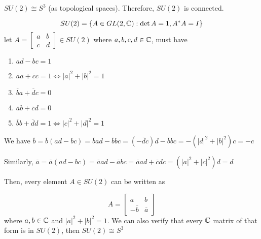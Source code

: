 \documentclass{article}
\begin{document}
\begin{longproof}
\begin{claim}
    $SU(2) \cong S^3$ (as topological spaces). Therefore, $SU(2)$ is connected.
\end{claim}

$$
    SU(2) = \{A \in GL(2, \mathbb{C}): \det A = 1, A^* A = I\}
$$
let $A = \begin{bmatrix} a & b \\ c & d \end{bmatrix} \in SU(2)$ where $a, b, c, d \in \mathbb{C}$, must have
\begin{enumerate}
    \item \label{1} $ad - bc = 1$
    \item \label{2} $\overline{a} a + \overline{c} c = 1 \iff |a|^2 + |b|^2 = 1$
    \item \label{3} $\overline{b} a + \overline{d} c = 0$
    \item \label{4} $\overline{a} b + \overline{c} d = 0$
    \item \label{5} $\overline{b} b + \overline{d} d = 1 \iff |c|^2 + |d|^2 = 1$
\end{enumerate}

We have
$
    \overline{b}
    = \overline{b}(ad - bc) 
    = \overline{b}ad - \overline{b}bc 
    = (-\overline{d}c)d - \overline{b}bc 
    = - (|d|^2 + |b|^2)c 
    = -c
$

Similarly, 
$
    \overline{a}
    = \overline{a}(ad - bc)
    = \overline{a}ad - \overline{a}bc 
    = \overline{a}ad + \overline{c}dc 
    = (|a|^2 + |c|^2)d 
    = d
$

Then, every element $A \in SU(2)$ can be written as

$$
    A = \begin{bmatrix}
        a & b \\
        -\overline{b} & \overline{a}
    \end{bmatrix}
$$
where $a, b \in \mathbb{C}$ and $|a|^2 + |b|^2 = 1$. We can also verify that every $\mathbb{C}$ matrix of that form is in $SU(2)$, then $SU(2) \cong S^3$


\end{longproof}
\end{document}
